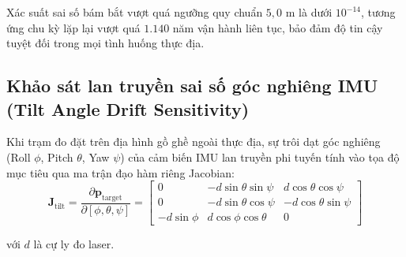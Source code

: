 Xác suất sai số bám bắt vượt quá ngưỡng quy chuẩn $5{,}0$ m là dưới $10^{-14}$, tương ứng chu kỳ lặp lại vượt quá $1.140$ năm vận hành liên tục, bảo đảm độ tin cậy tuyệt đối trong mọi tình huống thực địa.

\subsection{Khảo sát lan truyền sai số góc nghiêng IMU (Tilt Angle Drift Sensitivity)}

\hspace{0.5cm} Khi trạm đo đặt trên địa hình gồ ghề ngoài thực địa, sự trôi dạt góc nghiêng (Roll $\phi$, Pitch $\theta$, Yaw $\psi$) của cảm biến IMU lan truyền phi tuyến tính vào tọa độ mục tiêu qua ma trận đạo hàm riêng Jacobian:
\begin{equation}
\mathbf{J}_{\text{tilt}} = \frac{\partial \mathbf{p}_{\text{target}}}{\partial [\phi, \theta, \psi]} = \begin{bmatrix}
0 & -d \sin\theta \sin\psi & d \cos\theta \cos\psi \\
0 & -d \sin\theta \cos\psi & -d \cos\theta \sin\psi \\
-d \sin\phi & d \cos\phi \cos\theta & 0
\end{bmatrix}
\label{eq:tilt-jacobian-matrix}
\end{equation}

với $d$ là cự ly đo laser.

\begin{table}[H]
\centering
\caption{Khảo sát sai số vị trí theo góc trôi dạt IMU tại các cự ly quan sát danh định}
\label{tab:tilt-drift-sensitivity-table}
\end{table}

